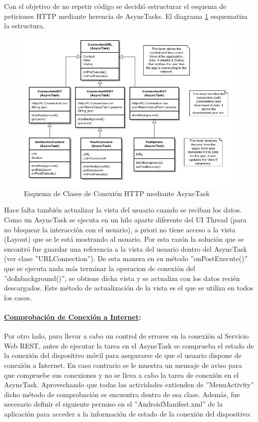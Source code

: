 Con el objetivo de no repetir código se decidió estructurar el esquema de peticiones HTTP mediante herencia de AsyncTasks. El diagrama \ref{fig:classConnectionTree} esquematiza la estructura.

	\begin{figure}[!]
	  \centering
	    \includegraphics[keepaspectratio, scale=0.6]{Media/Diagrams/classDiagramAsyncTask.png}
	  \caption{Esquema de Clases de Conexión HTTP mediante AsyncTask}
	  \label{fig:classConnectionTree}
	\end{figure}	
	
	Hace falta también actualizar la vista del usuario cuando se reciban los datos. Como un AsyncTask se ejecuta en un hilo aparte diferente del UI Thread (para no bloquear la interacción con el usuario), a priori no tiene acceso a la vista (Layout) que se le está mostrando al usuario. Por esta razón la solución que se encontró fue guardar una referencia a la vista del usuario dentro del AsyncTask (ver clase ''URLConnection''). De esta manera en su método ''onPostExecute()'' que se ejecuta nada más terminar la operacion de conexión del ''doInbackground()'', se obtiene dicha vista y se actualiza con los datos recién descargados. Este método de actualización de la vista es el que se utiliza en todos los casos. \\
		
		\paragraph{\underline{Comprobación de Conexión a Internet}:}
		
		Por otro lado, para llevar a cabo un control de errores en la conexión al Servicio Web REST, antes de ejecutar la tarea en el AsyncTask se comprueba el estado de la conexión del dispositivo móvil para asegurarse de que el usuario dispone de conexión a Internet. En caso contrario se le muestra un mensaje de aviso para que compruebe sus conexiones y no se lleva a cabo la tarea de conexión en el AsyncTask. Aprovechando que todas las actividades extienden de ''MenuActivity'' dicho método de comprobación se encuentra dentro de esa clase. Además, fue necesario definir el siguiente permiso en el ''AndroidManifest.xml'' de la aplicación para acceder a la información de estado de la conexión del dispositivo:
		
